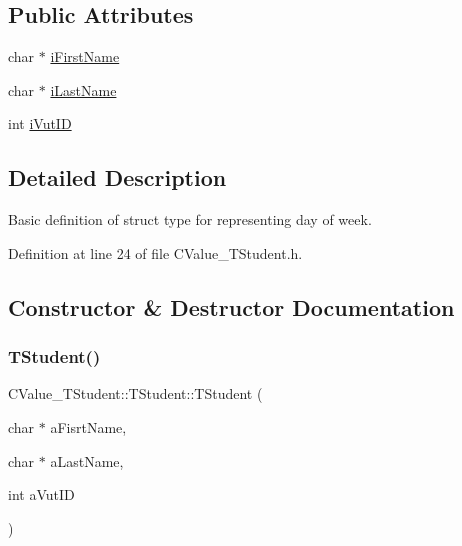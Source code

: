 \subsection*{Public Attributes}
\begin{DoxyCompactItemize}
\item 
char $\ast$ \hyperlink{struct_c_value___t_student_1_1_t_student_a5eb1830e69db30e4e2a54d6bdc3f649f}{i\+First\+Name}
\item 
char $\ast$ \hyperlink{struct_c_value___t_student_1_1_t_student_a00b625fc49750e98e28e9d0d013bba66}{i\+Last\+Name}
\item 
int \hyperlink{struct_c_value___t_student_1_1_t_student_aaf7deea3a78dc217d85b4e23f677150f}{i\+Vut\+ID}
\end{DoxyCompactItemize}


\subsection{Detailed Description}
Basic definition of struct type for representing day of week. 

Definition at line 24 of file C\+Value\+\_\+\+T\+Student.\+h.



\subsection{Constructor \& Destructor Documentation}
\mbox{\label{struct_c_value___t_student_1_1_t_student_ae052eac687165ae925ca2a15bccc9d95}} 
\subsubsection{\texorpdfstring{T\+Student()}{TStudent()}}
{\footnotesize\ttfamily C\+Value\+\_\+\+T\+Student\+::\+T\+Student\+::\+T\+Student (\begin{DoxyParamCaption}\item[{char $\ast$}]{a\+Fisrt\+Name,  }\item[{char $\ast$}]{a\+Last\+Name,  }\item[{int}]{a\+Vut\+ID }\end{DoxyParamCaption})\hspace{0.3cm}{\ttfamily [inline]}}



